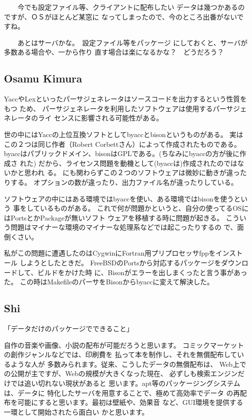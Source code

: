 \documentclass[mingoth,a4paper]{jsarticle}
\begin{document}
\begin{multicols}{2}
{　　今でも設定ファイル等、クライアントに配布したい
データは幾つかあるのですが、ＯＳがほとんど某窓に
なってしまったので、今のところ出番がないですね。

　　あとはサーバかな。　設定ファイル等をパッケージ
にしておくと、サーバが多数ある場合や、一から作り
直す場合は楽になるかな？　どうだろう？


\subsection{Osamu Kimura}

YaccやLexといったパーサジェネレータはソースコードを出力するという性質をもつ
ため、
パーサジェネレータを利用したソフトウェアは使用するパーサジェネレータのライ
センスに影響される可能性がある。

世の中にはYaccの上位互換ソフトとしてbyaccとbisonというものがある。
実はこの２つは同じ作者（Robert Corbettさん）によって作成されたものである。
byaccはパブリックドメイン、bisonはGPLである。(ちなみにbyaccの方が後に作成さ
れた)
だから、ライセンス問題を動機として(byaccは)作成されたのではないかと思われ
る。
にも関わらずこの２つのソフトウェアは微妙に動きが違ったりする。
オプションの数が違ったり、出力ファイル名が違ったりしている。

ソフトウェアの中にはある環境ではbyaccを使い、ある環境ではbisonを使うという
事をしているものがある。
これで何が問題かというと、自分の使ってるOSにはPortsとかPackageが無いソフト
ウェアを移植する時に問題が起きる。
こういう問題はマイナーな環境のマイナーな処理系などでは起こったりするの
で、面倒くさい。

私がこの問題に遭遇したのはCygwinにFortran用プリプロセッサfppをインストール
しようとしたときだ。
FreeBSDのPortsから対応するパッケージをダウンロードして、ビルドをかけた時
に、Bisonがエラーを出しまくったと言う事があった。
この時はMakefileのパーサをBisonからbyaccに変えて解決した。

\subsection{Shi}

「データだけのパッケージでできること」

自作の音楽や画像、小説の配布が可能だろうと思います。
コミックマーケットの創作ジャンルなどでは、印刷費を
払って本を制作し、それを無償配布しているような人が
多数みられます。従来、こうしたデータの無償配布は、
Web上での公開が主ですが、Webの規模が大きくなった現在、
必ずしも検索エンジンだけでは追い切れない現状があると
思います。apt等のパッケージングシステムは、データに
特化したサーバを用意することで、極めて高効率でデータ
の再配布を可能にすると思います。最初は壁紙や、効果音
など、GUI環境を提供する一環として開始されたら面白い
かと思います。


}
\end{multicols}
\end{document}
